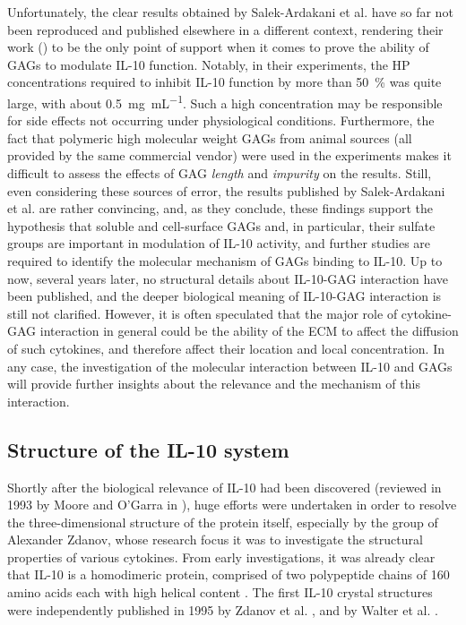 Unfortunately, the clear results obtained by Salek-Ardakani et al. have so far
not been reproduced and published elsewhere in a different context, rendering
their work (\cite{salek_ardakani_2000}) to be the only point of support when it
comes to prove the ability of GAGs to modulate IL-10 function. Notably, in their
experiments, the HP concentrations required to inhibit IL-10 function by more
than \SI{50}{\percent} was quite large, with about
\SI{0.5}{\milli\gram\per\milli\liter}. Such a high concentration may be
responsible for side effects not occurring under physiological conditions.
Furthermore, the fact that polymeric high molecular weight GAGs from animal
sources (all provided by the same commercial vendor) were used in the
experiments makes it difficult to assess the effects of GAG \textit{length} and
\textit{impurity} on the results. Still, even considering these sources of
error, the results published by Salek-Ardakani et al. are rather convincing,
and, as they conclude, these findings support the hypothesis that soluble and
cell-surface GAGs and, in particular, their sulfate groups are important in
modulation of IL-10 activity, and further studies are required to identify the
molecular mechanism of GAGs binding to IL-10. Up to now, several years later, no
structural details about IL-10-GAG interaction have been published, and the
deeper biological meaning of IL-10-GAG interaction is still not clarified.
However, it is often speculated that the major role of cytokine-GAG interaction
in general could be the ability of the ECM to affect the diffusion of such
cytokines, and therefore affect their location and local concentration. In any
case, the investigation of the molecular interaction between IL-10 and GAGs will
provide further insights about the relevance and the mechanism of this
interaction.


\subsection{Structure of the IL-10 system}

Shortly after the biological relevance of IL-10 had been discovered (reviewed in
1993 by Moore and O'Garra in \cite{il10_first_review_1993}), huge efforts were
undertaken in order to resolve the three-dimensional structure of the protein
itself, especially by the group of Alexander Zdanov, whose research focus it was
to investigate the structural properties of various cytokines. From early
investigations, it was already clear that IL-10 is a homodimeric protein,
comprised of two polypeptide chains of 160 amino acids each with high helical
content \cite{vieira_moore_il10homodimer_1991}. The first IL-10 crystal
structures were independently published in 1995 by Zdanov et al.
\cite{Zdanov1995}, and by Walter et al. \cite{il10_crystal_walter_1995}.

